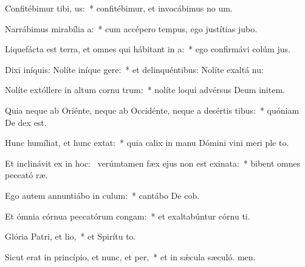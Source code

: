 \item Confitébimur tibi, us:~* confitébimur, et invocábimus no um.
\item Narrábimus mirabília a:~* cum accépero tempus, ego justítias jubo.
\item Liquefácta est terra, et omnes qui hábitant in a:~* ego confirmávi colúm jus.
\item Dixi iníquis: Nolíte iníque gere:~* et delinquéntibus: Nolíte exaltá nu:
\item Nolíte extóllere in altum cornu trum:~* nolíte loqui advérsus Deum initem.
\item Quia neque ab Oriénte, neque ab Occidénte, neque a desértis tibus:~* quóniam De dex est.
\item Hunc humíliat, et hunc extat:~* quia calix in manu Dómini vini meri ple to.
\item Et inclinávit ex  in hoc:~\pscross{} verúmtamen fæx ejus non est exinata:~* bibent omnes peccató ræ.
\item Ego autem annuntiábo in culum:~* cantábo De cob.
\item Et ómnia córnua peccatórum congam:~* et exaltabúntur córnu ti.
\item Glória Patri, et lio,~* et Spirítu to.
\item Sicut erat in princípio, et nunc, et per,~* et in sǽcula sæculó. men.
